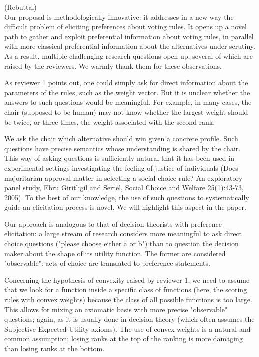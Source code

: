 (Rebuttal)\\
Our proposal is methodologically innovative: it addresses in a new way the difficult problem of eliciting preferences about voting rules. It opens up a novel path to gather and exploit preferential information about voting rules, in parallel with more classical preferential information about the alternatives under scrutiny. As a result, multiple challenging research questions open up, several of which are raised by the reviewers. We warmly thank them for these observations.

As reviewer 1 points out, one could simply ask for direct information about the parameters of the rules, such as the weight vector. But it is unclear whether the answers to such questions would be meaningful. For example, in many cases, the chair (supposed to be human) may not know whether the largest weight should be twice, or three times, the weight associated with the second rank.

We ask the chair which alternative should win given a concrete profile. Such questions have precise semantics whose understanding is shared by the chair. This way of asking questions is sufficiently natural that it has been used in experimental settings investigating the feeling of justice of individuals (Does majoritarian approval matter in selecting a social choice rule? An exploratory panel study, Ebru Giritligil and Sertel, Social Choice and Welfare 25(1):43-73, 2005). To the best of our knowledge, the use of such questions to systematically guide an elicitation process is novel. We will highlight this aspect in the paper.

Our approach is analogous to that of decision theorists with preference elicitation: a large stream of research considers more meaningful to ask direct choice questions ("please choose either a or b") than to question the decision maker about the shape of its utility function. The former are considered "observable": acts of choice are translated to preference statements.

Concerning the hypothesis of convexity raised by reviewer 1, we need to assume that we look for a function inside a specific class of functions (here, the scoring rules with convex weights) because the class of all possible functions is too large. This allows for mixing an axiomatic basis with more precise "observable" questions; again, as it is usually done in decision theory (which often assumes the Subjective Expected Utility axioms). The use of convex weights is a natural and common assumption: losing ranks at the top of the ranking is more damaging than losing ranks at the bottom.

